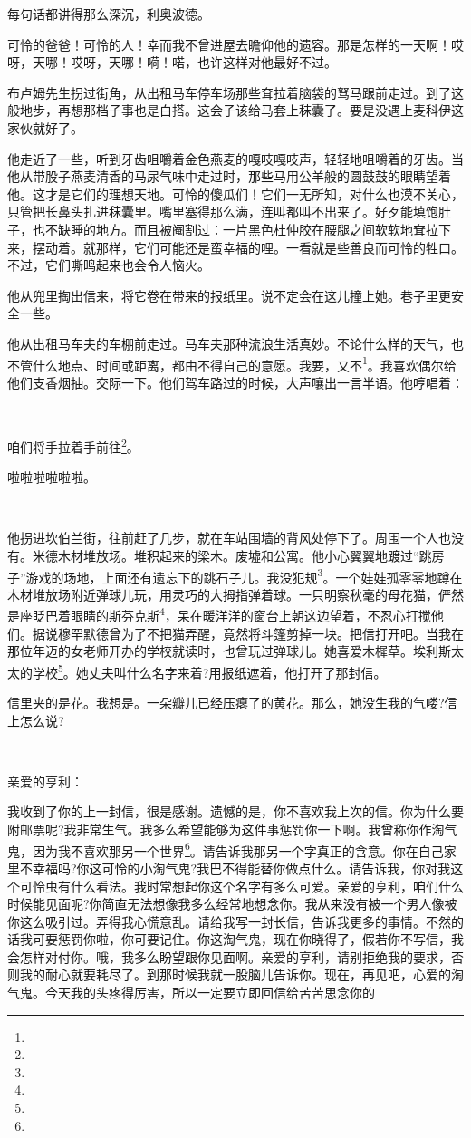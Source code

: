 \par 每句话都讲得那么深沉，利奥波德。
\par 可怜的爸爸！可怜的人！幸而我不曾进屋去瞻仰他的遗容。那是怎样的一天啊！哎呀，天哪！哎呀，天哪！嗬！喏，也许这样对他最好不过。
\par 布卢姆先生拐过街角，从出租马车停车场那些耷拉着脑袋的驽马跟前走过。到了这般地步，再想那档子事也是白搭。这会子该给马套上秣囊了。要是没遇上麦科伊这家伙就好了。
\par 他走近了一些，听到牙齿咀嚼着金色燕麦的嘎吱嘎吱声，轻轻地咀嚼着的牙齿。当他从带股子燕麦清香的马尿气味中走过时，那些马用公羊般的圆鼓鼓的眼睛望着他。这才是它们的理想天地。可怜的傻瓜们！它们一无所知，对什么也漠不关心，只管把长鼻头扎进秣囊里。嘴里塞得那么满，连叫都叫不出来了。好歹能填饱肚子，也不缺睡的地方。而且被阉割过：一片黑色杜仲胶在腰腿之间软软地耷拉下来，摆动着。就那样，它们可能还是蛮幸福的哩。一看就是些善良而可怜的牲口。不过，它们嘶鸣起来也会令人恼火。
\par 他从兜里掏出信来，将它卷在带来的报纸里。说不定会在这儿撞上她。巷子里更安全一些。
\par 他从出租马车夫的车棚前走过。马车夫那种流浪生活真妙。不论什么样的天气，也不管什么地点、时间或距离，都由不得自己的意愿。我要，又不\footnote{}。我喜欢偶尔给他们支香烟抽。交际一下。他们驾车路过的时候，大声嚷出一言半语。他哼唱着：
\par  
\par 咱们将手拉着手前往\footnote{}。
\par 啦啦啦啦啦啦。
\par  
\par 他拐进坎伯兰街，往前赶了几步，就在车站围墙的背风处停下了。周围一个人也没有。米德木材堆放场。堆积起来的梁木。废墟和公寓。他小心翼翼地踱过“跳房子”游戏的场地，上面还有遗忘下的跳石子儿。我没犯规\footnote{}。一个娃娃孤零零地蹲在木材堆放场附近弹球儿玩，用灵巧的大拇指弹着球。一只明察秋毫的母花猫，俨然是座眨巴着眼睛的斯芬克斯\footnote{}，呆在暖洋洋的窗台上朝这边望着，不忍心打搅他们。据说穆罕默德曾为了不把猫弄醒，竟然将斗篷剪掉一块。把信打开吧。当我在那位年迈的女老师开办的学校就读时，也曾玩过弹球儿。她喜爱木樨草。埃利斯太太的学校\footnote{}。她丈夫叫什么名字来着?用报纸遮着，他打开了那封信。
\par 信里夹的是花。我想是。一朵瓣儿已经压瘪了的黄花。那么，她没生我的气喽?信上怎么说?
\par  
\par 亲爱的亨利：
\par 我收到了你的上一封信，很是感谢。遗憾的是，你不喜欢我上次的信。你为什么要附邮票呢?我非常生气。我多么希望能够为这件事惩罚你一下啊。我曾称你作淘气鬼，因为我不喜欢那另一个世界\footnote{}。请告诉我那另一个字真正的含意。你在自己家里不幸福吗?你这可怜的小淘气鬼?我巴不得能替你做点什么。请告诉我，你对我这个可怜虫有什么看法。我时常想起你这个名字有多么可爱。亲爱的亨利，咱们什么时候能见面呢?你简直无法想像我多么经常地想念你。我从来没有被一个男人像被你这么吸引过。弄得我心慌意乱。请给我写一封长信，告诉我更多的事情。不然的话我可要惩罚你啦，你可要记住。你这淘气鬼，现在你晓得了，假若你不写信，我会怎样对付你。哦，我多么盼望跟你见面啊。亲爱的亨利，请别拒绝我的要求，否则我的耐心就要耗尽了。到那时候我就一股脑儿告诉你。现在，再见吧，心爱的淘气鬼。今天我的头疼得厉害，所以一定要立即回信给苦苦思念你的
